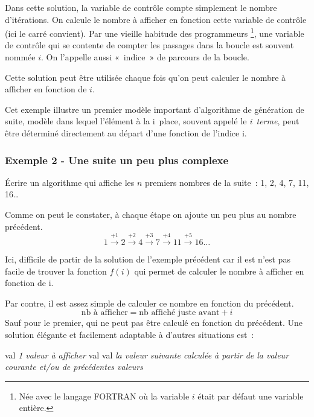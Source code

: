 		Dans cette solution,
		la variable de contrôle compte simplement le nombre d’itérations.
		On calcule le nombre à afficher en fonction cette variable de contrôle 
		(ici le carré convient).
		Par une vieille habitude des programmeurs%
		\footnote{%
			Née avec le langage FORTRAN 
			où la variable $i$ était par défaut une variable entière.
		},
		une variable de contrôle 
		qui se contente de compter les passages dans la boucle 
		est souvent nommée $i$. 
		On l’appelle aussi «~indice~» de parcours de la boucle.	

		Cette solution peut être utilisée
		chaque fois qu’on peut calculer le nombre à afficher
		en fonction de $i$.
		
		Cet exemple illustre un premier modèle important d'algorithme 
		de génération de suite, modèle dans lequel l'élément 
		à la i\ieme\ place, souvent appelé le \textit{i\ieme\ terme},
		peut être déterminé directement
		au départ d'une fonction de l'indice i.
		 	 
	\subsubsection{Exemple 2 - Une suite un peu plus complexe}
	 
		Écrire un algorithme qui affiche 
		les $n$ premiers nombres de la suite~:
		1, 2, 4, 7, 11, 16\dots{}
		
		Comme on peut le constater, 
		à chaque étape on ajoute un peu plus au nombre précédent.
		\[ 
			1 
			\xrightarrow{+1} 2 
			\xrightarrow{+2} 4
			\xrightarrow{+3} 7 
			\xrightarrow{+4} 11 
			\xrightarrow{+5} 16 
			\dots
		\] 

		Ici, difficile de partir de la solution de l’exemple précédent
		car il est n’est pas facile de trouver la fonction $f(i)$
		qui permet de calculer le nombre à afficher en fonction de i. 
		
		Par contre, il est assez simple de calculer ce nombre 
		en fonction du précédent.
		\[
			\mbox{nb à afficher} = \mbox{nb affiché juste avant} + i
		\]
		Sauf pour le premier, qui ne peut pas être calculé
		en fonction du précédent.
		Une solution élégante et facilement adaptable
		à d’autres situations est~:
		
		\begin{LDA}
				\Let val \Gets \textit{1\iere{} valeur à afficher}
					\Write val
					\Let val \Gets \textit{la valeur suivante calculée à partir de la valeur courante et/ou de précédentes valeurs}
				\EndFor
			\EndAlgo
		\end{LDA}
		
